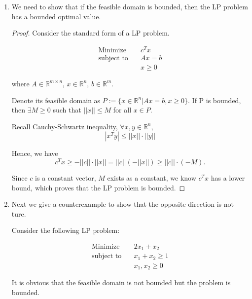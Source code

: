 \documentclass[12pt]{article}
\begin{document}
\begin{enumerate}
\item
We need to show that if the feasible domain is bounded, then the LP problem has a bounded optimal value.

\begin{proof}

Consider the standard form of a LP problem.

\begin{equation*}
\begin{aligned}
\text{Minimize} \quad & c^Tx \\
\text{subject\  to} \quad & Ax = b \\
 & x \geqslant 0
\end{aligned}
\end{equation*}

where $A \in \mathbb{R}^{m\times n}$, $x\in \mathbb{R}^n$, $b \in \mathbb{R}^m$.

Denote its feasible domain as $P := \{x \in \mathbb{R}^n | Ax = b, x \geqslant 0 \}$. If P is bounded, then $\exists M \geqslant 0$ such that $||x|| \leqslant M$ for all $x \in P$.

Recall Cauchy-Schwartz inequality, $\forall x, y \in \mathbb{R}^n$, 
$$
|x^Ty| \leqslant ||x||\cdot||y||
$$

Hence, we have 
$$
c^Tx \geqslant - ||c||\cdot ||x|| = ||c||(-||x||) \geqslant ||c||\cdot (-M).
$$

Since $c$ is a constant vector, $M$ exists as a constant, we know $c^Tx$ has a lower bound, which proves that the LP problem is bounded.

\end{proof}

\item

Next we give a counterexample to show that the opposite direction is not ture. 

Consider the following LP problem:

\begin{equation}
\begin{aligned}
\text{Minimize} \quad & 2x_1 + x_2 \\
\text{subject\  to} \quad & x_1 + x_2 \geqslant 1 \\
& x_1, x_2 \geqslant 0
\end{aligned}
\end{equation}

It is obvious that the feasible domain is not bounded but the problem is bounded.

\end{enumerate}
\end{document}
